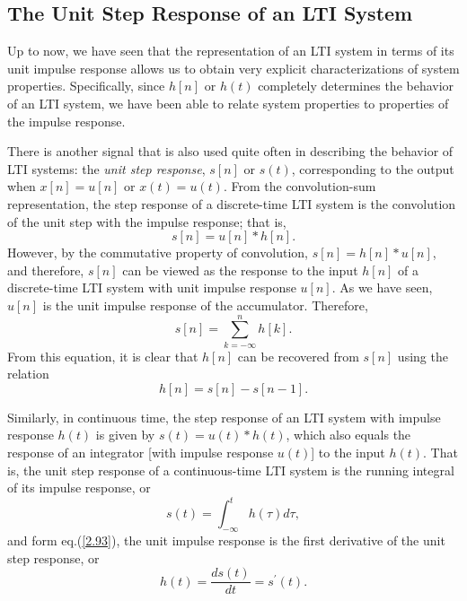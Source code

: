 \documentclass[a4paper,10pt,twoside]{book}
\begin{document}
\subsection{The Unit Step Response of an LTI System}

Up to now, we have seen that the representation of an LTI system in terms of its unit impulse response allows us to obtain very explicit characterizations of system properties. Specifically, since $h[n]$ or $h(t)$ completely determines the behavior of an LTI system, we have been able to relate system properties  to properties of the impulse response.

There is another signal that is also used quite often in describing the behavior of LTI systems: the \textit{unit step response}, $s[n]$ or $s(t)$, corresponding to the output when $x[n]=u[n]$ or $x(t)=u(t)$. From the convolution-sum representation, the step response of a discrete-time LTI system is the convolution of the unit step with the impulse response; that is, $$s[n]=u[n]*h[n].$$ However, by the commutative property of convolution, $s[n]=h[n]*u[n]$, and therefore, $s[n]$ can be viewed as the response to the input $h[n]$ of a discrete-time LTI system with unit impulse response $u[n]$. As we have seen, $u[n]$ is the unit impulse response of the accumulator. Therefore,
\begin{equation}
    s[n]=\sum_{k=-\infty}^nh[k].
    \label{2.91}
\end{equation}
From this equation, it is clear that $h[n]$ can be recovered from $s[n]$ using the relation
\begin{equation}
    h[n]=s[n]-s[n-1].
    \label{2.92}
\end{equation}

Similarly, in continuous time, the step response of an LTI system with impulse response $h(t)$ is given by $s(t)=u(t)*h(t)$, which also equals the response of an integrator [with impulse response $u(t)$] to the input $h(t)$. That is, the unit step response of a continuous-time LTI system is the running integral of its impulse response, or
\begin{equation}
    s(t)=\int_{-\infty}^th(\tau)d\tau,
    \label{2.93}
\end{equation}
and form eq.\;(\ref{2.93}), the unit impulse response is the first derivative of the unit step response, or
\begin{equation}
    h(t)=\frac{ds(t)}{dt}=s^{\prime}(t).
    \label{2.94}
\end{equation}
\end{document}
